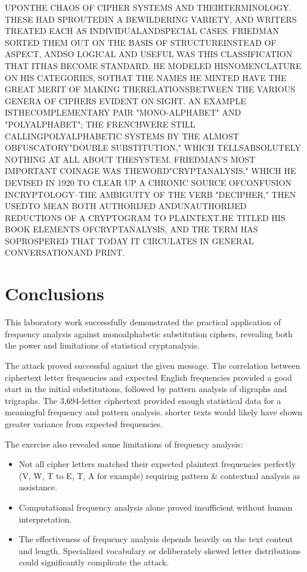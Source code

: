 \documentclass[a4paper,12pt]{article}
\begin{document}
UPONTHE CHAOS OF CIPHER SYSTEMS AND THEIRTERMINOLOGY. THESE HAD SPROUTEDIN A BEWILDERING VARIETY, AND WRITERS TREATED EACH AS INDIVIDUALANDSPECIAL CASES. FRIEDMAN SORTED THEM OUT ON THE BASIS OF STRUCTUREINSTEAD OF ASPECT, ANDSO LOGICAL AND USEFUL WAS THIS CLASSIFICATION THAT ITHAS BECOME STANDARD. HE MODELED HISNOMENCLATURE ON HIS CATEGORIES, SOTHAT THE NAMES HE MINTED HAVE THE GREAT MERIT OF MAKING THERELATIONSBETWEEN THE VARIOUS GENERA OF CIPHERS EVIDENT ON SIGHT. AN EXAMPLE ISTHECOMPLEMENTARY PAIR "MONO-ALPHABET" AND "POLYALPHABET"; THE FRENCHWERE STILL CALLINGPOLYALPHABETIC SYSTEMS BY THE ALMOST OBFUSCATORY"DOUBLE SUBSTITUTION," WHICH TELLSABSOLUTELY NOTHING AT ALL ABOUT THESYSTEM. FRIEDMAN'S MOST IMPORTANT COINAGE WAS THEWORD"CRYPTANALYSIS," WHICH HE DEVISED IN 1920 TO CLEAR UP A CHRONIC SOURCE OFCONFUSION INCRYPTOLOGY--THE AMBIGUITY OF THE VERB "DECIPHER," THEN USEDTO MEAN BOTH AUTHORIJED ANDUNAUTHORIJED REDUCTIONS OF A CRYPTOGRAM TO PLAINTEXT.HE TITLED HIS BOOK ELEMENTS OFCRYPTANALYSIS, AND THE TERM HAS SOPROSPERED THAT TODAY IT CIRCULATES IN GENERAL CONVERSATIONAND PRINT.
\section{Conclusions}
\label{sec:org45f3bae}
This laboratory work successfully demonstrated the practical application of frequency analysis against monoalphabetic substitution ciphers, revealing both the power and limitations of statistical cryptanalysis.

The attack proved successful against the given message. The correlation between ciphertext letter frequencies and expected English frequencies provided a good start in the initial substitutions, followed by pattern analysis of digraphs and trigraphs. The 3,694-letter ciphertext provided enough statistical data for a meaningful frequency and pattern analysis. shorter texts would likely have shown greater variance from expected frequencies.

The exercise also revealed some limitations of frequency analysis:
\begin{itemize}
\item Not all cipher letters matched their expected plaintext frequencies perfectly (V, W, T to  E, T, A for example) requiring pattern \& contextual analysis as assistance.
\item Computational frequency analysis alone proved insufficient without human interpretation.
\item The effectiveness of frequency analysis depends heavily on the text content and length. Specialized vocabulary or deliberately skewed letter distributions could significantly complicate the attack.
\end{itemize}
\end{document}
